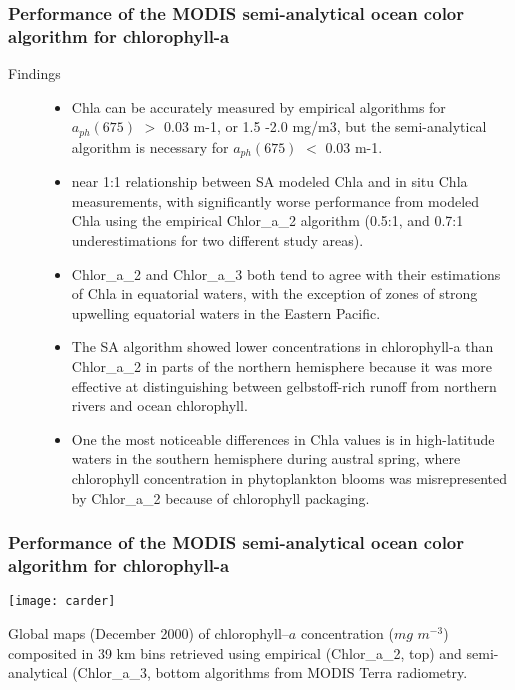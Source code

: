 \begin{frame}\frametitle{Performance of the MODIS semi-analytical ocean color algorithm for chlorophyll-a} 
\scriptsize
\begin{description}
    \item[Findings]
        \begin{itemize}
            \item Chla can be accurately measured by empirical algorithms for $a_{ph}(675)$ $>$ 0.03 m-1, or 1.5 -2.0 mg/m3, but the semi-analytical algorithm is necessary for $a_{ph}(675)$ $<$ 0.03 m-1.
            \item near 1:1 relationship between SA modeled Chla and in situ Chla measurements, with significantly worse performance from modeled Chla using the empirical Chlor\_a\_2 algorithm (0.5:1, and 0.7:1 underestimations for two different study areas). 
            \item Chlor\_a\_2 and Chlor\_a\_3 both tend to agree with their estimations of Chla in equatorial waters, with the exception of zones of strong upwelling equatorial waters in the Eastern Pacific.
            \item The SA algorithm showed lower concentrations in chlorophyll-a than Chlor\_a\_2 in parts of the northern hemisphere because it was more effective at distinguishing between gelbstoff-rich runoff from northern rivers and ocean chlorophyll.
            \item One the most noticeable differences in Chla values is in high-latitude waters in the southern hemisphere during austral spring, where chlorophyll concentration in phytoplankton blooms was misrepresented by Chlor\_a\_2 because of chlorophyll packaging. 
        \end{itemize}
\end{description}

\end{frame}

\begin{frame}\frametitle{Performance of the MODIS semi-analytical ocean color algorithm for chlorophyll-a} 
    \begin{center}
        \texttt{[image: carder]}

\tiny Global maps (December 2000) of chlorophyll--$a$ concentration ($mg$ $m^{-3}$) composited in 39 km bins retrieved using empirical (Chlor\_a\_2, top) and semi-analytical (Chlor\_a\_3, bottom algorithms from MODIS Terra radiometry.
    \end{center}

\end{frame}
